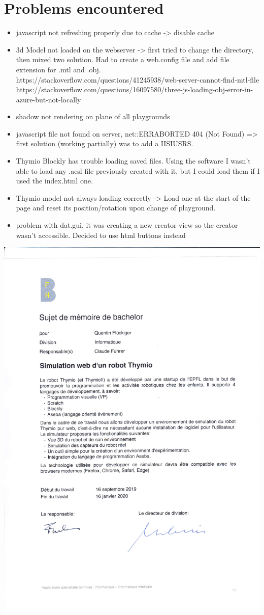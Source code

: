 \documentclass{scrbook}
\begin{document}
\chapter{Problems encountered}
\begin{itemize}
  \item javascript not refreshing properly due to cache -> disable cache
  \item 3d Model not loaded on the webserver -> first tried to change the directory, then mixed two solution. 
        Had to create a web.config file and add file extension for .mtl and .obj.
        https://stackoverflow.com/questions/41245938/web-server-cannot-find-mtl-file
        https://stackoverflow.com/questions/16097580/three-js-loading-obj-error-in-azure-but-not-locally
  \item shadow not rendering on plane of all playgrounds
  \item javascript file not found on server, net::ERR\textunderscore ABORTED 404 (Not Found) => first solution (working partially) was to add a IIS\textunderscore IUSRS.
  \item Thymio Blockly has trouble loading saved files. Using the software I wasn't able to load any .aesl file previously created with it, but I could load them if I used the index.html one.
  \item Thymio model not always loading correctly -> Load one at the start of the page and reset its position/rotation upon change of playground.
  \item problem with dat.gui, it was creating a new creator view so the creator wasn't accessible. Decided to use html buttons instead
\end{itemize}

\includegraphics{./bachelor_quentin.pdf}

\printbibliography[heading=bibintoc]
\end{document}
